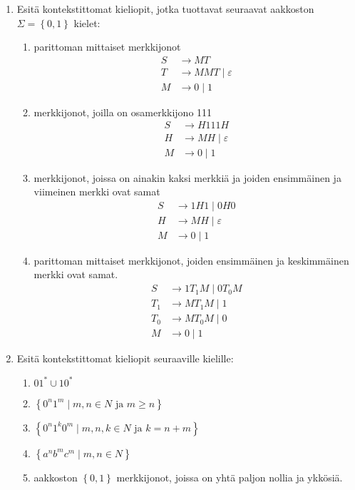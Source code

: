 \documentclass[a4paper,11pt]{article}
\newcommand{\set}[1]{{\left\{ #1 \right\}}}
\begin{document}
\begin{enumerate}
\item
  Esitä kontekstittomat kieliopit, jotka tuottavat seuraavat aakkoston
  $\Sigma=\set{0,1}$ kielet:
  \begin{enumerate}
  \item
    parittoman mittaiset merkkijonot
    \begin{align*}
      S & \to MT \\
      T & \to MMT \mid \varepsilon \\
      M & \to 0 \mid 1
    \end{align*}
  \item
    merkkijonot, joilla on osamerkkijono 111
    \begin{align*}
      S & \to H111H \\
      H & \to MH \mid \varepsilon \\
      M & \to 0 \mid 1
    \end{align*}
  \item
    merkkijonot, joissa on ainakin kaksi merkkiä ja joiden
    ensimmäinen ja viimeinen merkki ovat samat
    \begin{align*}
      S & \to 1H1 \mid 0H0 \\
      H & \to MH \mid \varepsilon \\
      M & \to 0 \mid 1
    \end{align*}
  \item
    parittoman mittaiset merkkijonot, joiden ensimmäinen ja
    keskimmäinen merkki ovat samat.
    \begin{align*}
      S & \to 1T_1M \mid 0T_0M \\
      T_1 & \to MT_1M \mid 1 \\
      T_0 & \to MT_0M \mid 0 \\
      M & \to 0 \mid 1
    \end{align*}
  \end{enumerate}

\item
  Esitä kontekstittomat  kieliopit seuraaville kielille:
  \begin{enumerate}
  \item $01^\ast\cup10^\ast$
  \item $\set{0^n1^m\mid\mbox{$m,n\in N$ ja $m\geq n$}}$
  \item $\set{0^n1^k0^m\mid\mbox{$m,n,k\in N$ ja $k=n+m$}}$
  \item $\set{a^n b^m c^m\mid m,n\in N}$
  \item
    aakkoston $\set{0,1}$ merkkijonot, joissa on yhtä paljon nollia ja
    ykkösiä.
  \end{enumerate}



\end{enumerate}
\end{document}
